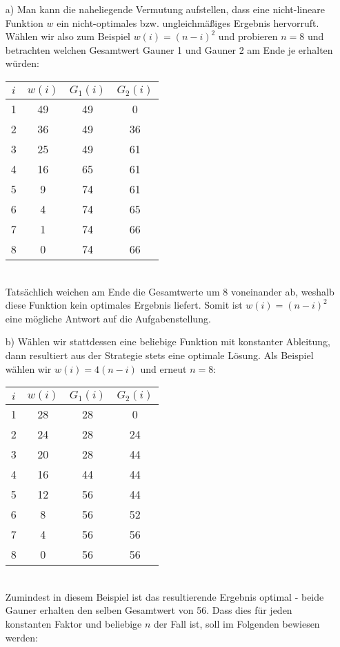 \documentclass{article}
\begin{document}
    \begin{enumerate}
        \item[a)] Man kann die naheliegende Vermutung aufstellen, dass eine nicht-lineare Funktion $w$ ein nicht-optimales bzw. ungleichmäßiges Ergebnis hervorruft. Wählen wir also zum Beispiel $w(i) = (n-i)^2$ und probieren $n=8$ und betrachten welchen Gesamtwert Gauner 1 und Gauner 2 am Ende je erhalten würden:
        \begin{table*}[h]
            \centering
            \begin{tabular}{c|c|cc}
                $i$ & $w(i)$ & $G_1(i)$ & $G_2(i)$ \\ \hline
                1 & 49 & 49 & 0 \\ \hline
                2 & 36 & 49 & 36 \\
                3 & 25 & 49 & 61 \\ \hline
                4 & 16 & 65 & 61 \\
                5 & 9  & 74 & 61 \\ \hline
                6 & 4  & 74 & 65 \\
                7 & 1  & 74 & 66 \\ \hline
                8 & 0  & 74 & 66
            \end{tabular}
        \end{table*} \\
        Tatsächlich weichen am Ende die Gesamtwerte um 8 voneinander ab, weshalb diese Funktion kein optimales Ergebnis liefert. Somit ist $w(i) = (n-i)^2$ eine mögliche Antwort auf die Aufgabenstellung.
        \item[b)]
        Wählen wir stattdessen eine beliebige Funktion mit konstanter Ableitung, dann resultiert aus der Strategie stets eine optimale Lösung. Als Beispiel wählen wir $w(i) = 4(n-i)$ und erneut $n=8$:
        \begin{table*}[h]
            \centering
            \begin{tabular}{c|c|cc}
                $i$ & $w(i)$ & $G_1(i)$ & $G_2(i)$ \\ \hline
                1 & 28 & 28 & 0 \\ \hline
                2 & 24 & 28 & 24 \\
                3 & 20 & 28 & 44 \\ \hline
                4 & 16 & 44 & 44 \\
                5 & 12 & 56 & 44 \\ \hline
                6 & 8  & 56 & 52 \\
                7 & 4  & 56 & 56 \\ \hline
                8 & 0  & 56 & 56
            \end{tabular}
        \end{table*}\\
        Zumindest in diesem Beispiel ist das resultierende Ergebnis optimal - beide Gauner erhalten den selben Gesamtwert von 56. Dass dies für jeden konstanten Faktor und beliebige $n$ der Fall ist, soll im Folgenden bewiesen werden: 


\end{enumerate}
\end{document}
